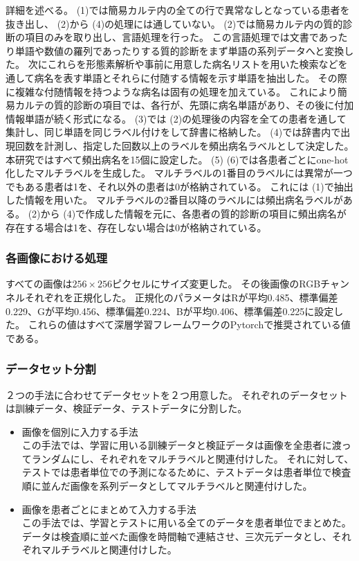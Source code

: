 詳細を述べる。
 (1)では簡易カルテ内の全ての行で異常なしとなっている患者を抜き出し、 (2)から (4)の処理には通していない。
 (2)では簡易カルテ内の質的診断の項目のみを取り出し、言語処理を行った。
この言語処理では文書であったり単語や数値の羅列であったりする質的診断をまず単語の系列データへと変換した。
次にこれらを形態素解析\cite{MeCab}や事前に用意した病名リストを用いた検索などを通して病名を表す単語とそれらに付随する情報を示す単語を抽出した。
その際に複雑な付随情報を持つような病名は固有の処理を加えている。
これにより簡易カルテの質的診断の項目では、各行が、先頭に病名単語があり、その後に付加情報単語が続く形式になる。
(3)では (2)の処理後の内容を全ての患者を通して集計し、同じ単語を同じラベル付けをして辞書に格納した。 
(4)では辞書内で出現回数を計測し、指定した回数以上のラベルを頻出病名ラベルとして決定した。
本研究ではすべて頻出病名を15個に設定した。
 (5) (6)では各患者ごとにone-hot化したマルチラベルを生成した。
マルチラベルの1番目のラベルには異常が一つでもある患者は1を、それ以外の患者は0が格納されている。
これには (1)で抽出した情報を用いた。
マルチラベルの2番目以降のラベルには頻出病名ラベルがある。 
(2)から (4)で作成した情報を元に、各患者の質的診断の項目に頻出病名が存在する場合は1を、存在しない場合は0が格納されている。
\subsubsection{各画像における処理}
すべての画像は$256 \times 256$ピクセルにサイズ変更した。
その後画像のRGBチャンネルそれぞれを正規化した。
正規化のパラメータはRが平均0.485、標準偏差0.229、Gが平均0.456、標準偏差0.224、Bが平均0.406、標準偏差0.225に設定した。
これらの値はすべて深層学習フレームワークのPytorch\cite{Pytorch}で推奨されている値である。
\subsubsection{データセット分割}
２つの手法に合わせてデータセットを２つ用意した。
それぞれのデータセットは訓練データ、検証データ、テストデータに分割した。
\begin{itemize}
    \item 画像を個別に入力する手法\\
この手法では、学習に用いる訓練データと検証データは画像を全患者に渡ってランダムにし、それぞれをマルチラベルと関連付けした。
それに対して、テストでは患者単位での予測になるために、テストデータは患者単位で検査順に並んだ画像を系列データとしてマルチラベルと関連付けした。
    \item 画像を患者ごとにまとめて入力する手法\\
この手法では、学習とテストに用いる全てのデータを患者単位でまとめた。
データは検査順に並べた画像を時間軸で連結させ、三次元データとし、それぞれマルチラベルと関連付けした。
\end{itemize}

